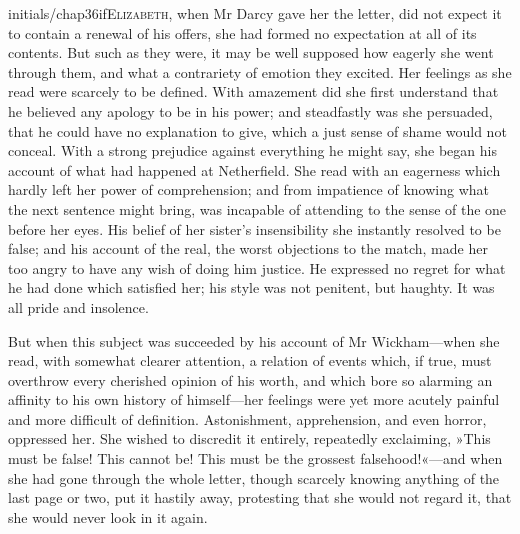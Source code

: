 \lettrine[lines=8,image=true]{initials/chap36if}{Elizabeth,} when Mr Darcy gave her the letter, did not expect it to contain a renewal of his offers, she had formed no expectation at all of its contents. But such as they were, it may be well supposed how eagerly she went through them, and what a contrariety of emotion they excited. Her feelings as she read were scarcely to be defined. With amazement did she first understand that he believed any apology to be in his power; and steadfastly was she persuaded, that he could have no explanation to give, which a just sense of shame would not conceal. With a strong prejudice against everything he might say, she began his account of what had happened at Netherfield. She read with an eagerness which hardly left her power of comprehension; and from impatience of knowing what the next sentence might bring, was incapable of attending to the sense of the one before her eyes. His belief of her sister's insensibility she instantly resolved to be false; and his account of the real, the worst objections to the match, made her too angry to have any wish of doing him justice. He expressed no regret for what he had done which satisfied her; his style was not penitent, but haughty. It was all pride and insolence.

But when this subject was succeeded by his account of Mr Wick\-ham—when she read, with somewhat clearer attention, a relation of events which, if true, must overthrow every cherished opinion of his worth, and which bore so alarming an affinity to his own history of himself—her feelings were yet more acutely painful and more difficult of definition. Astonishment, apprehension, and even horror, oppressed her. She wished to discredit it entirely, repeatedly exclaiming, »This must be false! This cannot be! This must be the grossest falsehood!«—and when she had gone through the whole letter, though scarcely knowing anything of the last page or two, put it hastily away, protesting that she would not regard it, that she would never look in it again.


